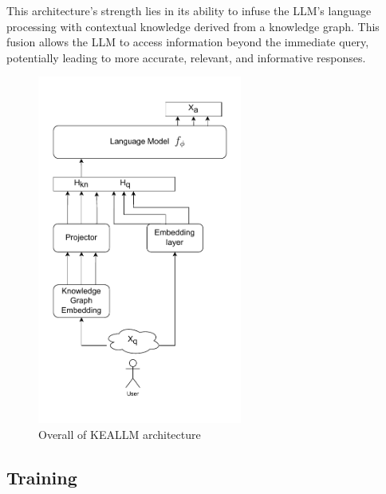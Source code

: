 This architecture's strength lies in its ability to infuse the LLM's language processing with contextual knowledge derived from a knowledge graph. This fusion allows the LLM to access information beyond the immediate query, potentially leading to more accurate, relevant, and informative responses.
\begin{figure}[hbt]
    \centering
    \includegraphics[width=0.6\textwidth]{experiements/image/keallm.pdf}
    \caption{Overall of KEALLM architecture}
    \label{fig:keallm_arch}
\end{figure}

\subsection{Training}
